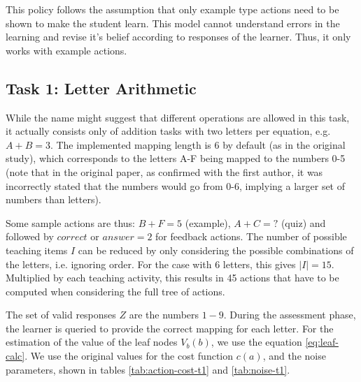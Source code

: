 This policy follows the assumption that only example type actions need to be shown to make the student learn. This model cannot understand errors in the learning and revise it's belief according to responses of the learner. Thus, it only works with example actions.

\subsection{Task 1: Letter Arithmetic}

While the name might suggest that different operations are allowed in this task, it actually consists only of addition tasks with two letters per equation, e.g. $A+B=3$. The implemented mapping length is 6 by default (as in the original study), which corresponds to the letters A-F being mapped to the numbers 0-5 (note that in the original paper, as confirmed with the first author, it was incorrectly stated that the numbers would go from 0-6, implying a larger set of numbers than letters).

Some sample actions are thus: $B+F=5$ (example), $A+C=?$ (quiz) and followed by $correct$ or $answer=2$ for feedback actions. 
The number of possible teaching items $I$ can be reduced by only considering the possible combinations of the letters, i.e. ignoring order. For the case with 6 letters, this gives $|I|=15$.
Multiplied by each teaching activity, this results in 45 actions that have to be computed when considering the full tree of actions.

The set of valid responses $Z$ are the numbers $1-9$.
During the assessment phase, the learner is queried to provide the correct mapping for each letter.
For the estimation of the value of the leaf nodes $V_b(b)$, we use the equation \ref{eq:leaf-calc}.
We use the original values for the cost function $c(a)$, and the noise parameters, shown in tables \ref{tab:action-cost-t1} and \ref{tab:noise-t1}.

